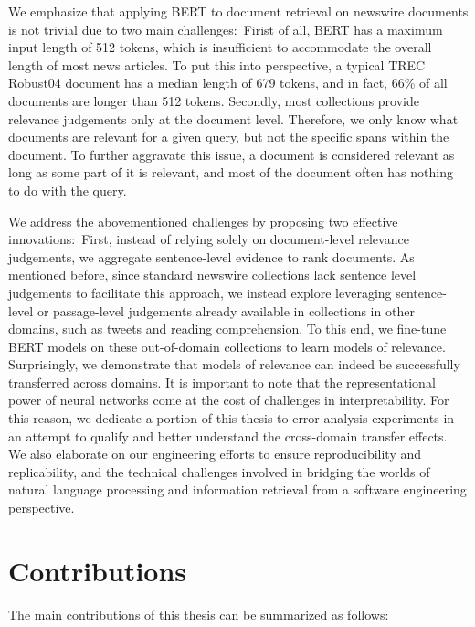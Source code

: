 We emphasize that applying BERT to document retrieval on newswire documents is not trivial due to two main challenges:\
Firist of all, BERT has a maximum input length of 512 tokens, which is insufficient to accommodate the overall length of most news articles.
To put this into perspective, a typical TREC Robust04 document has a median length of 679 tokens, and in fact, 66\% of all documents are longer than 512 tokens.
Secondly, most collections provide relevance judgements only at the document level.
Therefore, we only know what documents are relevant for a given query, but not the specific spans within the document.
To further aggravate this issue, a document is considered relevant as long as some part of it is relevant, and most of the document often has nothing to do with the query.

We address the abovementioned challenges by proposing two effective innovations:\
First, instead of relying solely on document-level relevance judgements, we aggregate sentence-level evidence to rank documents.
As mentioned before, since standard newswire collections lack sentence level judgements to facilitate this approach, we instead explore leveraging sentence-level or passage-level judgements already available in collections in other domains, such as tweets and reading comprehension.
To this end, we fine-tune BERT models on these out-of-domain collections to learn models of relevance.
Surprisingly, we demonstrate that models of relevance can indeed be successfully transferred across domains.
It is important to note that the representational power of neural networks come at the cost of challenges in interpretability.
For this reason, we dedicate a portion of this thesis to error analysis experiments in an attempt to qualify and better understand the cross-domain transfer effects.
We also elaborate on our engineering efforts to ensure reproducibility and replicability, and the technical challenges involved in bridging the worlds of natural language processing and information retrieval from a software engineering perspective.

\newpage

\section{Contributions}

The main contributions of this thesis can be summarized as follows:\\

